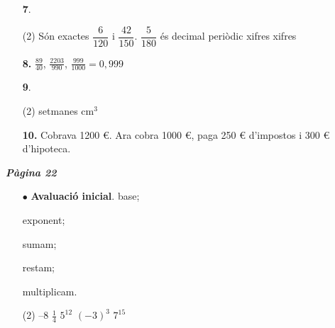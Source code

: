 \documentclass[a4paper, pdf, twoside]{book}
\begin{document}
\begin{multicols}{2}
\begin{enumerate}

 \item[\fontfamily{phv}\selectfont\color{blue}\textbf{7}. ]  \scalebox{0.6}{\simbolclau } 
 \begin{tasks}[column-sep=1em, item-indent=1.3333em](2)
	 \task* Són exactes $\dfrac {6}{120}$ i $\dfrac {42}{150}$. $\dfrac {5}{180}$ és decimal periòdic
	  xifres
	  xifres
\end{tasks}
\vspace{0.25cm}
\item[\fontfamily{phv}\selectfont\color{blue}\textbf{8. }]  \scalebox{0.6}{\simbolclau } 
$\frac {89}{40}$, $\frac {2203}{990}$, $\frac {999}{1000}=0,999$
\vspace{0.25cm}



 \item[\fontfamily{phv}\selectfont\color{blue}\textbf{9}. ]  \scalebox{0.6}{\simbolclau } 
 \begin{tasks}[column-sep=1em, item-indent=1.3333em](2)
	  setmanes
	  cm${}^{3}$
\end{tasks}
\vspace{0.25cm}
\item[\fontfamily{phv}\selectfont\color{blue}\textbf{10. }]  \scalebox{0.6}{\simbolclau } 
Cobrava 1200 \euro {}. Ara cobra 1000 \euro {}, paga 250 \euro {} d'impostos i 300 \euro {} d'hipoteca. 
 \end{enumerate}
\vfill\null
\columnbreak
\def\currentname{Solucions del Tema 2}
\vspace*{0.75cm}

 

\vspace*{0.4cm}
 {}
\vspace{0.3cm}


{\textbf{\em Pàgina 22}} \hrulefill
\begin{enumerate}
\vspace{0.25cm}
 \item[$\bullet$ ] {\selectfont\color{blue}\textbf{Avaluació inicial}. }
base;\par exponent;\par sumam;\par restam; \par multiplicam.\par \begin{tasks}(2) \task --8    \task $\frac {1}{4}$  \task $5^{12}$ \task $(-3)^3$ \task $7^{15}$ \end{tasks} 
 \end{enumerate}
\vspace{0.3cm}


\end{multicols}
\end{document}
